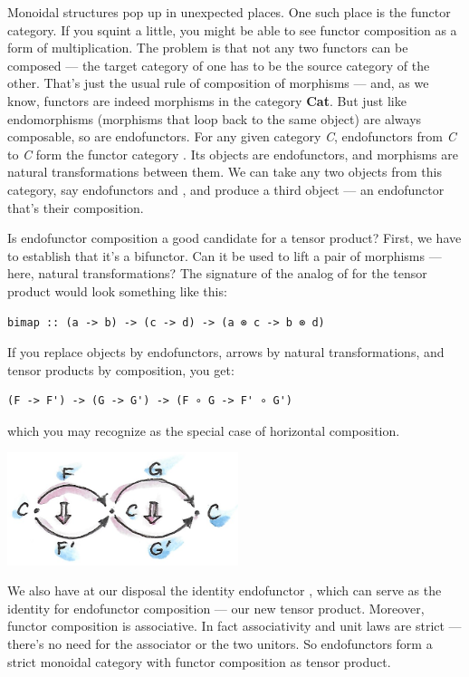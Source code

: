 Monoidal structures pop up in unexpected places. One such place is the
functor category. If you squint a little, you might be able to see
functor composition as a form of multiplication. The problem is that not
any two functors can be composed --- the target category of one has to
be the source category of the other. That's just the usual rule of
composition of morphisms --- and, as we know, functors are indeed
morphisms in the category \textbf{Cat}. But just like endomorphisms
(morphisms that loop back to the same object) are always composable, so
are endofunctors. For any given category \emph{C}, endofunctors from
\emph{C} to \emph{C} form the functor category \code{{[}C,\ C{]}}. Its
objects are endofunctors, and morphisms are natural transformations
between them. We can take any two objects from this category, say
endofunctors  and , and produce a third object
 --- an endofunctor that's their composition.

Is endofunctor composition a good candidate for a tensor product? First,
we have to establish that it's a bifunctor. Can it be used to lift a
pair of morphisms --- here, natural transformations? The signature of
the analog of  for the tensor product would look something
like this:

\begin{verbatim}
bimap :: (a -> b) -> (c -> d) -> (a ⊗ c -> b ⊗ d)
\end{verbatim}

If you replace objects by endofunctors, arrows by natural
transformations, and tensor products by composition, you get:

\begin{verbatim}
(F -> F') -> (G -> G') -> (F ∘ G -> F' ∘ G')
\end{verbatim}

which you may recognize as the special case of horizontal composition.

\includegraphics[width=2.65625in]{images/horizcomp.png}

We also have at our disposal the identity endofunctor , which
can serve as the identity for endofunctor composition --- our new tensor
product. Moreover, functor composition is associative. In fact
associativity and unit laws are strict --- there's no need for the
associator or the two unitors. So endofunctors form a strict monoidal
category with functor composition as tensor product.

